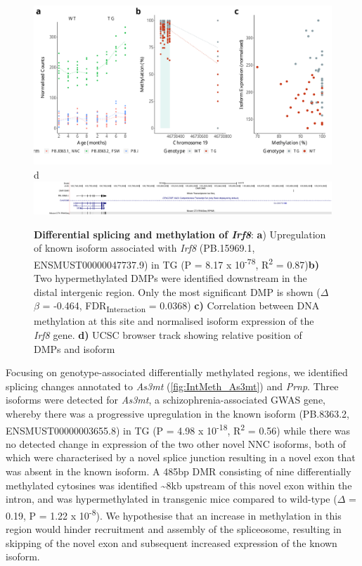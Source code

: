 \begin{figure}[]
	\includegraphics[page=5,scale = 0.4]{Figures/WholeDifferentialAnalysis_DMPDMR.pdf}
	\\
	\hspace*{0.2cm}\vspace{0.5cm}\large d
	\\
	\includegraphics[page=1,trim={1.5cm 0 0 0},scale = 0.9]{Figures/IRF8_DMP.pdf}
	\captionsetup{width=0.95\textwidth}
	\caption[Differential splicing and methylation of \textit{Irf8}]%
	{\textbf{Differential splicing and methylation of \textit{Irf8}}: \textbf{a}) Upregulation of known isoform associated with \textit{Irf8} (PB.15969.1, ENSMUST00000047737.9) in TG (P = 8.17 x 10\textsuperscript{-78}, R\textsuperscript{2} = 0.87)\textbf{b)} Two hypermethylated DMPs were identified downstream in the distal intergenic region. Only the most significant DMP is shown ($\Delta$$\beta$ = -0.464, FDR\textsubscript{Interaction} = 0.0368) \textbf{c)} Correlation between DNA methylation at this site and normalised isoform expression of the \textit{Irf8} gene. \textbf{d)} UCSC browser track showing relative position of DMPs and isoform}    
	\label{fig:IntMeth_Irf8}
\end{figure}

Focusing on genotype-associated differentially methylated regions, we identified splicing changes annotated to \textit{As3mt}  (\cref{fig:IntMeth_As3mt}) and \textit{Prnp}. Three isoforms were detected for \textit{As3mt}, a schizophrenia-associated GWAS gene, whereby there was a progressive upregulation in the known isoform (PB.8363.2, ENSMUST00000003655.8) in TG (P = 4.98 x 10\textsuperscript{-18}, R\textsuperscript{2} = 0.56) while there was no detected change in expression of the two other novel NNC isoforms, both of which were characterised by a novel splice junction resulting in a novel exon that was absent in the known isoform. A 485bp DMR consisting of nine differentially methylated cytosines was identified \textasciitilde{}8kb upstream of this novel exon within the intron, and was hypermethylated in transgenic mice compared to wild-type ($\Delta$ = 0.19, P = 1.22 x 10\textsuperscript{-8}). We hypothesise that an increase in methylation in this region would hinder recruitment and assembly of the spliceosome, resulting in skipping of the novel exon and subsequent increased expression of the known isoform. 

